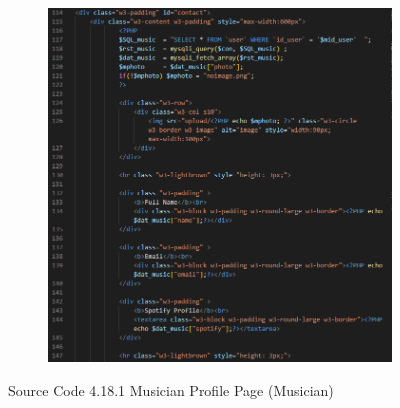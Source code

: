 \begin{enumerate}[1.]
\begin{figure}[h]
\begin{subfigure}[b]{0.8\textwidth}
            \label{fig:sub1}
        \end{subfigure}
        \hspace{0.04\textwidth}
        \begin{subfigure}[b]{0.8\textwidth}
            \centering
            \includegraphics[width=\textwidth]{mainmatter/images/frontend/code/mprofile2.png}
            \label{fig:sub2}
        \end{subfigure}
        \caption*{Source Code 4.18.1 Musician Profile Page (Musician)}
        \label{fig:myfig57a}
    \end{figure}
    \clearpage
    \begin{figure}[h]\ContinuedFloat
        \centering
        \begin{subfigure}[b]{0.8\textwidth}
            \centering

\end{subfigure}
\end{figure}
\end{enumerate}
